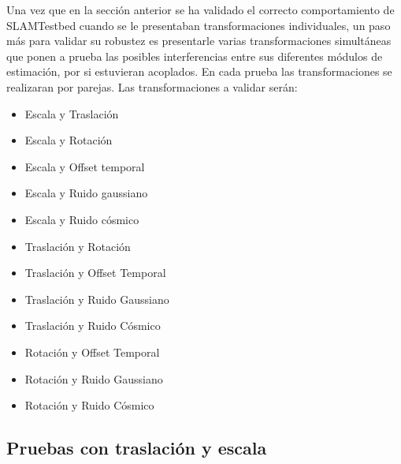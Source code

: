 Una vez que en la sección anterior se ha validado el correcto comportamiento de SLAMTestbed cuando se le presentaban transformaciones individuales, un paso más para validar su robustez es presentarle varias transformaciones simultáneas que ponen a prueba las posibles interferencias entre sus diferentes módulos de estimación, por si estuvieran acoplados. En cada prueba las transformaciones se realizaran por parejas.
Las transformaciones  a validar serán:
\begin{itemize}
 \item{Escala y Traslación}
 \item{Escala y Rotación}
 \item{Escala y Offset temporal}
 \item{Escala y Ruido gaussiano}
 \item{Escala y Ruido cósmico}

 \item{Traslación y Rotación}
 \item{Traslación y Offset Temporal}
 \item{Traslación y Ruido Gaussiano}
 \item{Traslación y Ruido Cósmico}

 \item{Rotación y Offset Temporal}
 \item{Rotación y Ruido Gaussiano}
 \item{Rotación y Ruido Cósmico}
\end{itemize}





\subsection{Pruebas con traslación y escala}

